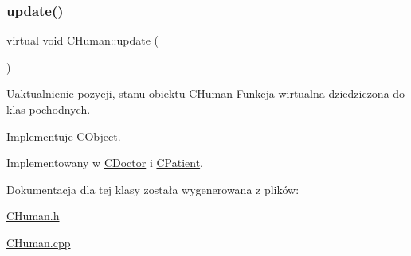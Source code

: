 \mbox{\label{class_c_human_adb7f7d855ace82f7517bb49f465ea5d9}} 
\subsubsection{\texorpdfstring{update()}{update()}}
{\footnotesize\ttfamily virtual void C\+Human\+::update (\begin{DoxyParamCaption}{ }\end{DoxyParamCaption})\hspace{0.3cm}{\ttfamily [pure virtual]}}



Uaktualnienie pozycji, stanu obiektu \mbox{\hyperlink{class_c_human}{C\+Human}} Funkcja wirtualna dziedziczona do klas pochodnych. 



Implementuje \mbox{\hyperlink{class_c_object_acb42ca516e836d0267ddb9a0556916a9}{C\+Object}}.



Implementowany w \mbox{\hyperlink{class_c_doctor_a9ae22158d776a4c489158b9b944fbe80}{C\+Doctor}} i \mbox{\hyperlink{class_c_patient_a40dd4c549f4b40928b95dd4d8f2ad311}{C\+Patient}}.



Dokumentacja dla tej klasy została wygenerowana z plików\+:\begin{DoxyCompactItemize}
\item 
\mbox{\hyperlink{_c_human_8h}{C\+Human.\+h}}\item 
\mbox{\hyperlink{_c_human_8cpp}{C\+Human.\+cpp}}\end{DoxyCompactItemize}
